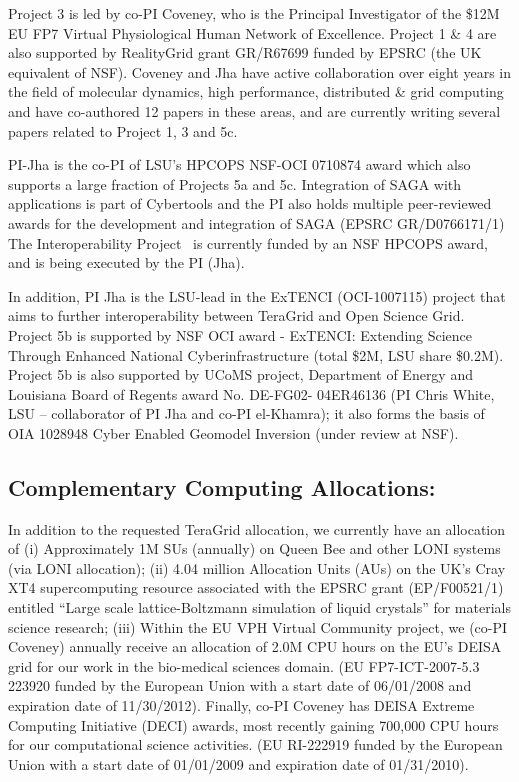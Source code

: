 \documentclass[a4paper,10pt]{article}
\newcommand{\up}{\vspace*{-1em}}
\begin{document}
Project 3 is led by co-PI Coveney, who is the Principal Investigator of the \$12M EU FP7 Virtual Physiological Human Network of Excellence. Project 1 \& 4 are also supported by RealityGrid grant GR/R67699 funded by EPSRC (the UK equivalent of NSF). Coveney and Jha have active collaboration over eight years in the field of molecular dynamics, high performance, distributed \& grid computing and have co-authored 12 papers in these areas, and are currently writing several papers related to Project 1, 3 and 5c.
 
PI-Jha is the co-PI of LSU's HPCOPS NSF-OCI 0710874 award which also
supports a large fraction of Projects 5a and 5c. Integration of SAGA
with applications is part of Cybertools and the PI also holds multiple
peer-reviewed awards for the development and integration of SAGA
(EPSRC GR/D0766171/1) The Interoperability Project~\cite{interop_url}
is currently funded by an NSF HPCOPS award, and is being executed by
the PI (Jha).

In addition,  PI Jha is the LSU-lead in the ExTENCI (OCI-1007115) project that aims to further interoperability between TeraGrid and Open Science Grid.  Project 5b is supported by NSF OCI award - ExTENCI: Extending Science Through Enhanced National Cyberinfrastructure (total \$2M, LSU share \$0.2M). Project 5b is also supported by UCoMS project, Department of Energy and Louisiana Board of Regents award No. DE-FG02- 04ER46136 (PI Chris White, LSU -- collaborator of PI Jha and co-PI el-Khamra); it also forms the basis of OIA 1028948 Cyber Enabled Geomodel Inversion (under review at NSF).

\up
\subsection{Complementary Computing Allocations:}
\up
 In addition to the requested TeraGrid allocation, we currently have an allocation of (i) Approximately 1M SUs (annually) on Queen Bee and other LONI systems (via LONI allocation); (ii) 4.04 million Allocation Units (AUs) on the UK's Cray XT4 supercomputing resource associated with the EPSRC grant (EP/F00521/1) entitled ``Large scale lattice-Boltzmann simulation of liquid crystals'' for materials science research; (iii) Within the EU VPH Virtual Community project, we (co-PI Coveney) annually receive an allocation of 2.0M CPU hours on the EU's DEISA grid for our work in the bio-medical sciences domain.  (EU FP7-ICT-2007-5.3 223920 funded by the European Union with a start date of 06/01/2008 and expiration date of 11/30/2012). Finally, co-PI Coveney has DEISA Extreme Computing Initiative (DECI) awards, most recently gaining 700,000 CPU hours for our computational science activities.  (EU RI-222919 funded by the European Union with a start date of 01/01/2009 and expiration date of 01/31/2010).
\end{document}
